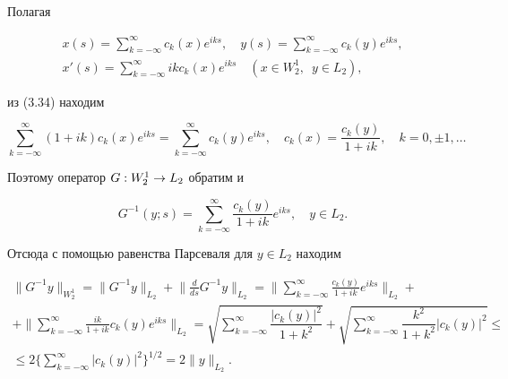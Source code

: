 Полагая


\begin{gather*}


x(s)=\sum_{k=-\infty}^\infty c_k(x) e^{iks},\quad


y(s)=\sum_{k=-\infty}^\infty c_k(y) e^{iks}, \\


%


x'(s)=\sum_{k=-\infty}^\infty ik c_k(x) e^{iks}\quad


(x\in W_2^1,\ \; y\in L_2),


\end{gather*}


из (3.34) находим


$$


\sum_{k=-\infty}^\infty (1+ik) c_k(x) e^{iks}=


\sum_{k=-\infty}^\infty c_k(y) e^{iks},


\quad c_k(x)=\frac{c_k(y)}{1+ik},\quad k=0,\pm 1,\dotsc


$$


Поэтому оператор $G : W_2^1 \to L_2$ обратим и


\begin{equation}


G^{-1}(y;s)=\sum_{k=-\infty}^\infty \frac{c_k(y)}{1+ik}e^{iks},\quad


y\in L_2.


\end{equation}


Отсюда с помощью равенства Парсеваля для $y\in L_2$ находим


\begin{multline}


\|G^{-1}y\|_{{W_2^1}} =\|G^{-1}y\|_{{L_2}} +\bigg\|\frac{d}{ds}G^{-1}y


\bigg\|_{L_2}=


\bigg\|\sum_{k=-\infty}^\infty \frac{c_k(y)}{1+ik}e^{iks}\bigg\|_{L_2}+ \\


%


+


\bigg\|\sum_{k=-\infty}^\infty \frac{ik}{1+ik}c_k(y)e^{iks}\bigg\|_{L_2}=


\sqrt{\textstyle\sum\limits_{k=-\infty}^\infty \dfrac{|c_k(y)|^2}{1+k^2}}+


\sqrt{\textstyle\sum\limits_{k=-\infty}^\infty


\dfrac{k^2}{1+k^2}|c_k(y)|^2}\leq \\


%


\leq 2\bigg\{ \sum_{k=-\infty}^\infty |c_k(y)|^2\bigg\}^{1/2}=


2 \|y\|_{{L_2}} .


\end{multline}


